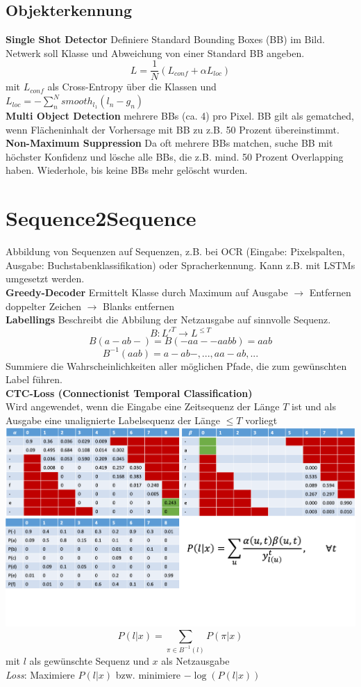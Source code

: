 \documentclass[12pt]{article}
\begin{document}
	\subsection{Objekterkennung}
	\textbf{Single Shot Detector} Definiere Standard Bounding Boxes (BB) im Bild. Netwerk soll Klasse und Abweichung von einer Standard BB angeben.
	$$L = \frac{1}{N} (L_{conf} + \alpha L_{loc})$$
	mit $L_{conf}$ als Cross-Entropy über die Klassen und $L_{loc} = - \sum_n^N smooth_{l_1}(l_n - g_n)$\\
	\textbf{Multi Object Detection} mehrere BBs (ca. 4) pro Pixel. BB gilt als gematched, wenn Flächeninhalt der Vorhersage mit BB zu z.B. 50 Prozent übereinstimmt.\\
	\textbf{Non-Maximum Suppression} Da oft mehrere BBs matchen, suche BB mit höchster Konfidenz und lösche alle BBs, die z.B. mind. 50 Prozent Overlapping haben. Wiederhole, bis keine BBs mehr gelöscht wurden.

	\section{Sequence2Sequence}
	Abbildung von Sequenzen auf Sequenzen, z.B. bei OCR (Eingabe: Pixelspalten, Ausgabe: Buchstabenklassifikation) oder Spracherkennung. Kann z.B. mit LSTMs umgesetzt werden.\\
	\textbf{Greedy-Decoder} Ermittelt Klasse durch Maximum auf Ausgabe $\rightarrow$ Entfernen doppelter Zeichen $\rightarrow$ Blanks entfernen\\
	\textbf{Labellings} Beschreibt die Abbilung der Netzausgabe auf sinnvolle Sequenz.
	$$B: L'^{T} \rightarrow L^{\leq T}$$
	$$B(a-ab-) = B(-aa--aabb) = aab$$
	$$B^{-1}(aab) = {a-ab-, ..., aa-ab, ...}$$
	Summiere die Wahrscheinlichkeiten aller möglichen Pfade, die zum gewünschten Label führen.\\
	\textbf{CTC-Loss (Connectionist Temporal Classification)}\\
	Wird angewendet, wenn die Eingabe eine Zeitsequenz der Länge $T$ ist und als Ausgabe eine unalignierte Labelsequenz der Länge $\leq T$ vorliegt\\
	\includegraphics[width=\linewidth]{figures/ctc-algorithmus.png}
	$$P(l|x) = \sum_{\pi \in B^{-1}(l)} P(\pi|x)$$
	mit $l$ als gewünschte Sequenz und $x$ als Netzausgabe\\
	\textit{Loss}: Maximiere $P(l|x)$ bzw. minimiere $-\log(P(l|x))$\\	
\end{document}
